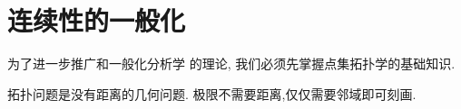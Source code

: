 \chapter{连续性的一般化}

为了进一步推广和一般化分析学 的理论, 我们必须先掌握点集拓扑学的基础知识.

\begin{note}
    拓扑问题是没有距离的几何问题.
    极限不需要距离,仅仅需要邻域即可刻画.
\end{note}


